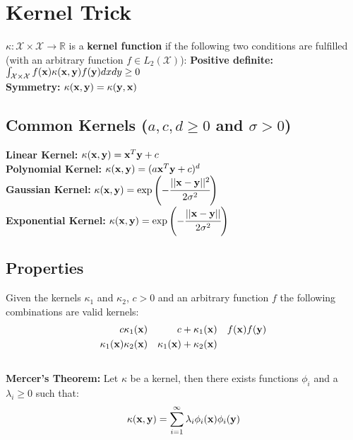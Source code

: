 \section{Kernel Trick}
\begin{mdframed}[style=eqbox]
$\kappa: \mathcal X \times \mathcal X \rightarrow \mathbb R$ is a \textbf{kernel function} if the following two conditions are fulfilled (with an arbitrary function $f \in L_2(\mathcal X)$):
\textbf{Positive definite:} $\int_{ \mathcal X \times \mathcal X} f(\mathbf{x}) \kappa(\mathbf{x}, \mathbf{y}) f( \mathbf{y}) dx dy \geq 0$\\
\textbf{Symmetry:}  $ \kappa(\mathbf{x}, \mathbf{y}) = \kappa(\mathbf{y}, \mathbf{x})$
\end{mdframed}
%
\begin{mdframed}[style=eqbox]
\subsection{Common Kernels (\(a, c, d \geq 0\) and \(\sigma > 0\))}
\textbf{Linear Kernel:} \(\kappa(\mathbf{x}, \mathbf{y}) = \mathbf{x}^T \mathbf{y} + c\)\\
\textbf{Polynomial Kernel:} \(\kappa(\mathbf{x}, \mathbf{y}) = (a \mathbf{x}^T \mathbf{y} + c)^d\)\\
\textbf{Gaussian Kernel:} \(\kappa(\mathbf{x}, \mathbf{y}) = \exp \left( -\cfrac{\vert\vert\mathbf{x} - \mathbf{y} \vert\vert^2}{2 \sigma^2} \right)\)\\
\textbf{Exponential Kernel:} \( \kappa(\mathbf{x}, \mathbf{y}) = \exp \left(- \cfrac{\vert\vert \mathbf{x} - \mathbf{y} \vert\vert}{2 \sigma^2} \right)\)
\end{mdframed}
%
\begin{mdframed}[style=eqbox]
\subsection{Properties}
Given the kernels $\kappa_1$ and $\kappa_2$, $c > 0$ and an arbitrary function $f$ the following combinations are valid kernels:
\vspace*{-8pt}\begin{align*}
  c \kappa_1(\mathbf{x}) && c + \kappa_1(\mathbf{x}) && f(\mathbf{x}) f(\mathbf{y})\\
  \kappa_1(\mathbf{x}) \kappa_2(\mathbf{x}) && \kappa_1(\mathbf{x}) + \kappa_2(\mathbf{x})
\end{align*}\vspace*{-16pt}\\
\textbf{Mercer's Theorem:}
Let $\kappa$ be a kernel, then there exists functions $\phi_i$ and a $\lambda_i \geq 0$ such that:
\vspace*{-8pt}\begin{align*}
\kappa(\mathbf{x}, \mathbf{y}) = \sum_{i=1}^{\infty} \lambda_i \phi_i(\mathbf{x}) \phi_i(\mathbf{y})
\end{align*}
\end{mdframed}